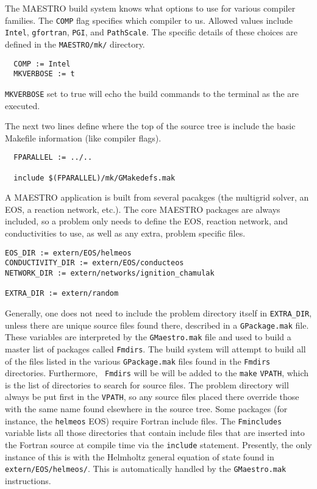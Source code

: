 The MAESTRO build system knows what options to use for various
compiler families.  The {\tt COMP} flag specifies which compiler to
us.  Allowed values include {\tt Intel}, {\tt gfortran}, {\tt PGI},
and {\tt PathScale}.  The specific details of these choices are
defined in the {\tt MAESTRO/mk/} directory.
\begin{verbatim}
  COMP := Intel
  MKVERBOSE := t
\end{verbatim}
{\tt MKVERBOSE} set to true will echo the build commands to the
terminal as the are executed.

The next two lines define where the top of the source tree is
include the basic Makefile information (like compiler
flags).
\begin{verbatim}
  FPARALLEL := ../..

  include $(FPARALLEL)/mk/GMakedefs.mak
\end{verbatim}

A MAESTRO application is built from several pacakges (the
multigrid solver, an EOS, a reaction network, etc.).  The core
MAESTRO packages are always included, so a problem only needs
to define the EOS, reaction network, and conductivities to
use, as well as any extra, problem specific files.  
\begin{verbatim}
EOS_DIR := extern/EOS/helmeos   
CONDUCTIVITY_DIR := extern/EOS/conducteos 
NETWORK_DIR := extern/networks/ignition_chamulak 

EXTRA_DIR := extern/random
\end{verbatim}
Generally, one does not need to include the problem directory itself
in {\tt EXTRA\_DIR}, unless there are unique source files found there,
described in a {\tt GPackage.mak} file.  These variables are
interpreted by the {\tt GMaestro.mak} file and used to build a master
list of packages called {\tt Fmdirs}.  The build system will attempt
to build all of the files listed in the various {\tt GPackage.mak}
files found in the {\tt Fmdirs} directories.  Furthermore, {\tt
  Fmdirs} will be will be added to the {\tt make} {\tt VPATH}, which
is the list of directories to search for source files.  The problem
directory will always be put first in the {\tt VPATH}, so any source
files placed there override those with the same name found elsewhere
in the source tree.  Some packages (for instance, the {\tt helmeos}
EOS) require Fortran include files.  The {\tt Fmincludes} variable
lists all those directories that contain include files that are
inserted into the Fortran source at compile time via the {\tt include}
statement.  Presently, the only instance of this is with the Helmholtz
general equation of state found in {\tt extern/EOS/helmeos/}.  This is
automatically handled by the {\tt GMaestro.mak} instructions.

